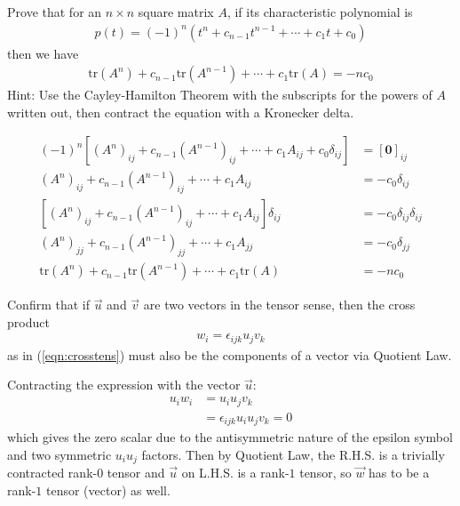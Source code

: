 \begin{Exercise}
Prove that for an $n \times n$ square matrix $A$, if its characteristic polynomial is
\begin{align*}
p(t) = (-1)^n(t^n + c_{n-1}t^{n-1} + \cdots + c_1 t + c_0)
\end{align*}
then we have
\begin{align*}
\text{tr}(A^n) + c_{n-1}\text{tr}(A^{n-1}) + \cdots + c_1 \text{tr}(A) = -nc_0
\end{align*}
Hint: Use the Cayley-Hamilton Theorem with the subscripts for the powers of $A$ written out, then contract the equation with a Kronecker delta.
\end{Exercise}
\begin{Answer}
\begin{align*}
(-1)^n[(A^n)_{ij} + c_{n-1}(A^{n-1})_{ij} + \cdots + c_1 A_{ij} + c_0\delta_{ij}] &= [\textbf{0}]_{ij} \\ 
(A^n)_{ij} + c_{n-1}(A^{n-1})_{ij} + \cdots + c_1 A_{ij} &= -c_0\delta_{ij} \\
[(A^n)_{ij} + c_{n-1}(A^{n-1})_{ij} + \cdots + c_1 A_{ij}]\delta_{ij} &= -c_0\delta_{ij}\delta_{ij} \\
(A^n)_{jj} + c_{n-1}(A^{n-1})_{jj} + \cdots + c_1 A_{jj} &= -c_0\delta_{jj} \\
\text{tr}(A^n) + c_{n-1}\text{tr}(A^{n-1}) + \cdots + c_1 \text{tr}(A) &= -nc_0
\end{align*}
\end{Answer}

\begin{Exercise}
Confirm that if $\vec{u}$ and $\vec{v}$ are two vectors in the tensor sense, then the cross product
\begin{align*}
w_i = \epsilon_{ijk}u_jv_k
\end{align*}
as in (\ref{eqn:crosstens}) must also be the components of a vector via Quotient Law.
\end{Exercise}
\begin{Answer}
Contracting the expression with the vector $\vec{u}$:
\begin{align*}
u_iw_i &= u_iu_jv_k \\
&= \epsilon_{ijk}u_iu_jv_k = 0
\end{align*}
which gives the zero scalar due to the antisymmetric nature of the epsilon symbol and two symmetric $u_iu_j$ factors. Then by Quotient Law, the R.H.S. is a trivially contracted rank-$0$ tensor and $\vec{u}$ on L.H.S. is a rank-$1$ tensor, so $\vec{w}$ has to be a rank-$1$ tensor (vector) as well.
\end{Answer}

